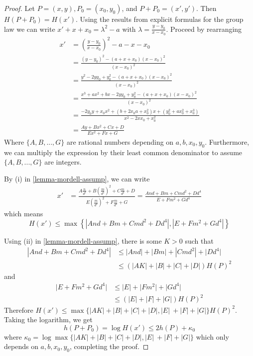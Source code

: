 \documentclass[12pt]{article}
\theoremstyle{remark}
\theoremstyle{definition}
\begin{document}
        \begin{proof}
            Let $P = (x, y), P_0 = (x_0, y_0)$, and $P + P_0 = (x',y')$. Then $H(P+P_0) = H(x')$. Using the results from explicit formulas for the group law we can write $x'+x+x_0 = \lambda^2-a$ with $\lambda = \frac{y-y_0}{x-x_0}$. Proceed by rearranging
            \begin{align*}
                x' &= \left(\frac{y-y_0}{x-x_0}\right)^2 -a -x-x_0\\
                &=\frac{(y-y_0)^2-(a+x+x_0)(x-x_0)^2}{(x-x_0)^2}\\
                &=\frac{y^2-2yy_0+y_0^2-(a+x+x_0)(x-x_0)^2}{(x-x_0)^2}\\
                &=\frac{x^3+ax^2+bx-2yy_0+y_0^2-(a+x+x_0)(x-x_0)^2}{(x-x_0)^2}\\
                &=\frac{-2y_0y+x_0x^2+(b+2x_0a+x_0^2)x+(y_0^2+ax_0^2+x_0^3)}{x^2-2xx_0+x_0^2}\\
                &=\frac{Ay+Bx^2+Cx+D}{Ex^2+Fx+G}
            \end{align*}
            Where $\{A,B,..., G\}$ are rational numbers depending on $a,b,x_0,y_0$. Furthermore, we can multiply the expression by their least common denominator to assume $\{A,B,..., G\}$ are integers.

            By (i) in \autoref{lemma-mordell-assump}, we can write
            \begin{align*}
                x'&=\frac{A\frac{n}{d^3} + B\left(\frac{m}{d^2}\right)^2+ C\frac{m}{d^2}+D}{E\left(\frac{m}{d^2}\right)^2 +F\frac{m}{d^2}+G}=\frac{And+Bm+Cmd^2+Dd^4}{E+Fm^2+Gd^4}
            \end{align*}
            which means
            \[H(x') \leqslant \max \left\{| And+Bm+Cmd^2+Dd^4|, |E+Fm^2+Gd^4| \right\}\]

            Using (ii) in \autoref{lemma-mordell-assump}, there is some $K>0$ such that
            \begin{align*}
                \left| And+Bm+Cmd^2+Dd^4\right|& \leqslant |And| + |Bm| + |Cmd^2| + \lvert Dd^4 \rvert\\
                &\leqslant(\lvert AK \rvert + \lvert B \rvert + \lvert C \rvert + \lvert D \rvert)H(P)^2
            \end{align*}
            and
            \begin{align*}
                \lvert E+Fm^2+Gd^4 \rvert &\leqslant \lvert E \rvert + \lvert Fm^2 \rvert + \lvert Gd^4 \rvert\\
                &\leqslant  (\lvert E \rvert + \lvert F \rvert + \lvert G \rvert)H(P)^2
            \end{align*}
            Therefore $H(x') \leqslant \max \{ \lvert AK\rvert+\lvert B\rvert+\lvert C\rvert+\lvert D \rvert, \lvert E \rvert\ + \lvert F\rvert + \lvert G \rvert \}H(P)^2 $. Taking the logarithm, we get
            $$h(P+P_0)=\log H(x') \leqslant 2h(P) + \kappa_0$$
            where $\kappa_0 = \log \max \{ \lvert AK\rvert+\lvert B\rvert+\lvert C\rvert+\lvert D \rvert, \lvert E \rvert\ + \lvert F\rvert + \lvert G \rvert \} $ which only depends on $a,b,x_0,y_0$, completing the proof.
        \end{proof}
\end{document}
